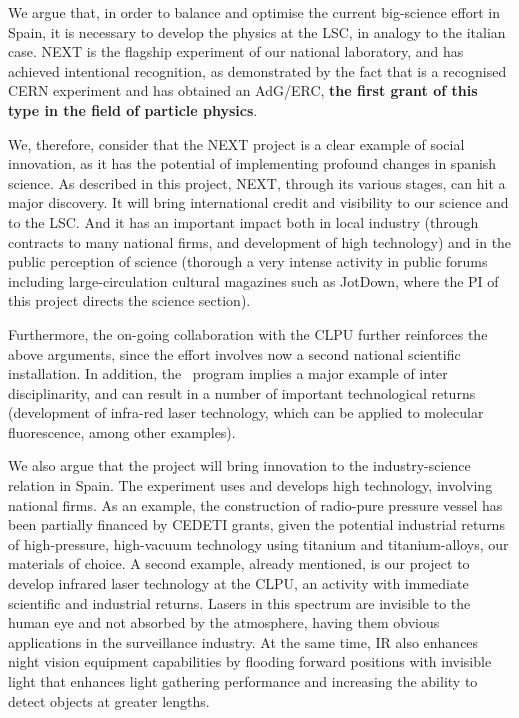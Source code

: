 We argue that, in order to balance and optimise the current big-science effort in Spain, it is necessary to develop the physics at the LSC, in analogy to the italian case. NEXT is the flagship experiment of our national laboratory, and has achieved intentional recognition, as demonstrated by the fact that is a recognised CERN experiment and has obtained an AdG/ERC, {\bf the first grant of this type in the field of particle physics}. 

We, therefore, consider that the NEXT project is a clear example of social innovation, as it has the potential of implementing profound changes in spanish science. As described in this project, NEXT, through its various stages, can hit a major discovery. It will bring international credit and visibility to our science and to the LSC. And it has an important impact both in local industry (through contracts to many national firms, and development of high technology) and in the public perception of science (thorough a very intense activity in public forums including large-circulation cultural magazines such as JotDown, where the PI of this project directs the science section). 

Furthermore, the on-going collaboration with the CLPU further reinforces the above arguments, since the effort involves now a second national scientific installation. In addition, the \BATA\ program implies a major example of inter disciplinarity, and can result in a number of important technological returns (development of infra-red laser technology, which can be applied to molecular fluorescence, among other examples).

We also argue that the project will bring innovation to the industry-science relation in Spain. The experiment uses and develops high technology, involving national firms. As an example, the construction of radio-pure pressure vessel has been partially financed by CEDETI grants, given the potential industrial returns of high-pressure, high-vacuum technology using titanium and titanium-alloys, our materials of choice. A second example, already mentioned, is our project to develop infrared laser technology at the CLPU, an activity with immediate scientific and industrial returns. Lasers in this spectrum are invisible to the human eye and not absorbed by the atmosphere, having them obvious applications in the surveillance industry. At the same time, IR also enhances night vision equipment capabilities by flooding forward positions with invisible light that enhances light gathering performance and increasing the ability to detect objects at greater lengths.

